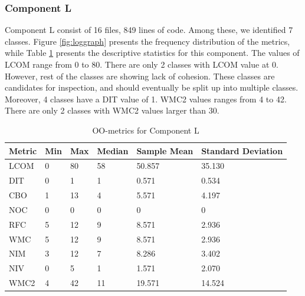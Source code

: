 \subsubsection{Component L}
Component L consist of 16 files, 849 lines of code. Among these, we identified 7 classes. Figure \ref{fig:loggraph} presents the frequency distribution of the metrics, while Table \ref{tab:oometrics-log} presents the descriptive statistics for this component. The values of LCOM range from 0 to 80. There are only 2 classes with LCOM value at 0. However, rest of the classes are showing lack of cohesion. These classes are candidates for inspection, and should eventually be split up into multiple classes. Moreover, 4 classes have a DIT value of 1. WMC2 values ranges from 4 to 42. There are only 2 classes with WMC2 values larger than 30.

\begin{table}[]
\centering
\caption{OO-metrics for Component L}
\label{tab:oometrics-log}
\begin{tabular}{|l|l|l|l|l|l|}
\hline
\textbf{Metric} & \textbf{Min} & \textbf{Max} & \textbf{Median} & \textbf{Sample Mean} & \textbf{Standard Deviation} \\ \hline
LCOM            & 0            & 80           & 58              & 50.857               & 35.130                      \\ \hline
DIT             & 0            & 1            & 1               & 0.571                & 0.534                       \\ \hline
CBO             & 1            & 13           & 4               & 5.571                & 4.197                       \\ \hline
NOC             & 0            & 0            & 0               & 0                    & 0                           \\ \hline
RFC             & 5            & 12           & 9               & 8.571                & 2.936                       \\ \hline
WMC             & 5            & 12           & 9               & 8.571                & 2.936                       \\ \hline
NIM             & 3            & 12           & 7               & 8.286                & 3.402                       \\ \hline
NIV             & 0            & 5            & 1               & 1.571                & 2.070                       \\ \hline
WMC2            & 4            & 42          & 11              & 19.571                 & 14.524                      \\ \hline
\end{tabular}
\end{table}



